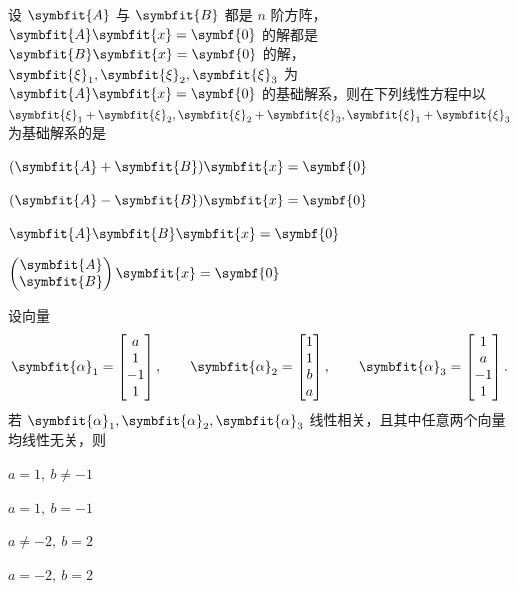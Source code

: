 \begin{question}[index=5]
设 $\symbfit{A}$ 与 $\symbfit{B}$ 都是 $n$ 阶方阵，$\symbfit{A}\symbfit{x}=\symbf{0}$ 的解都是
$\symbfit{B}\symbfit{x}=\symbf{0}$ 的解，$\symbfit{\xi}_1,\symbfit{\xi}_2,\symbfit{\xi}_3$ 为
$\symbfit{A}\symbfit{x}=\symbf{0}$ 的基础解系，则在下列线性方程中以
$\symbfit{\xi}_1+\symbfit{\xi}_2,\symbfit{\xi}_2+\symbfit{\xi}_3,\symbfit{\xi}_1+\symbfit{\xi}_3$ 为基础解系的是\paren
\begin{choices}[columns=4]
\item $(\symbfit{A}+\symbfit{B})\symbfit{x}=\symbf{0}$
\item $(\symbfit{A}-\symbfit{B})\symbfit{x}=\symbf{0}$
\item $\symbfit{A}\symbfit{B}\symbfit{x}=\symbf{0}$
\item $\begin{pmatrix}\symbfit{A}\\\symbfit{B}\end{pmatrix}\symbfit{x}=\symbf{0}$
\end{choices}
\end{question}

\begin{question}[index=6]
设向量
\[
\symbfit{\alpha}_1=\begin{bmatrix}a\\1\\-1\\1\end{bmatrix},\qquad
\symbfit{\alpha}_2=\begin{bmatrix}1\\1\\b\\a\end{bmatrix},\qquad
\symbfit{\alpha}_3=\begin{bmatrix}1\\a\\-1\\1\end{bmatrix}.
\]
若 $\symbfit{\alpha}_1,\symbfit{\alpha}_2,\symbfit{\alpha}_3$ 线性相关，且其中任意两个向量均线性无关，则\paren
\begin{choices}[columns=4]
\item $a=1,\ b\ne -1$
\item $a=1,\ b=-1$
\item $a\ne -2,\ b=2$
\item $a=-2,\ b=2$
\end{choices}
\end{question}

